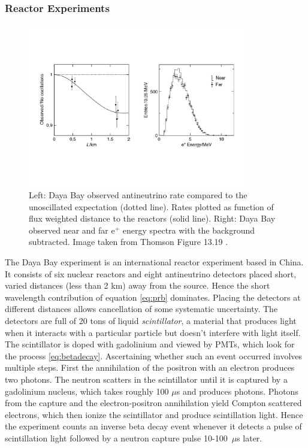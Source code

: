 \subsubsection{Reactor Experiments}

\begin{figure}
  \centering
  \includegraphics[width=0.85\textwidth,height=0.85\textheight,keepaspectratio]
                {pictures/t13_19.pdf}
  \vspace*{-20mm}
  \caption{Left: Daya Bay observed antineutrino rate compared to the
           unoscillated expectation (dotted line). Rates plotted as function
           of flux weighted distance to the reactors (solid line). Right:
           Daya Bay observed near and far e$^+$ energy spectra with the
           background subtracted. Image taken from Thomson Figure 13.19
           \cite{thomson_modern_2013}.}
\end{figure}

The Daya Bay experiment is an international reactor experiment based in China.
It consists of
six nuclear reactors and eight antineutrino detectors placed short, varied
distances (less than 2 km) away from the source. Hence the short
wavelength contribution of equation \eqref{eq:prb} dominates. Placing the
detectors at different distances allows cancellation of some systematic
uncertainty. The detectors are full of 20 tons of
liquid {\it scintillator}, a material that produces light when it interacts
with a particular particle but doesn't interfere with light itself.
The scintillator is doped with gadolinium and viewed by PMTs, which look for
the process \eqref{eq:betadecay}. Ascertaining whether such an event occurred
involves multiple steps. First the annihilation of the positron with an
electron produces two photons. The neutron scatters in the scintillator until
it is captured by a gadolinium nucleus, which takes roughly 100 $\mu$s and
produces photons. Photons from
the capture and the electron-positron annihilation yield Compton scattered
electrons, which then ionize the scintillator and produce scintillation light.
Hence the experiment counts an inverse beta decay event whenever it detects
a pulse of scintillation light followed by a neutron capture pulse
10-100~$\mu$s later.

